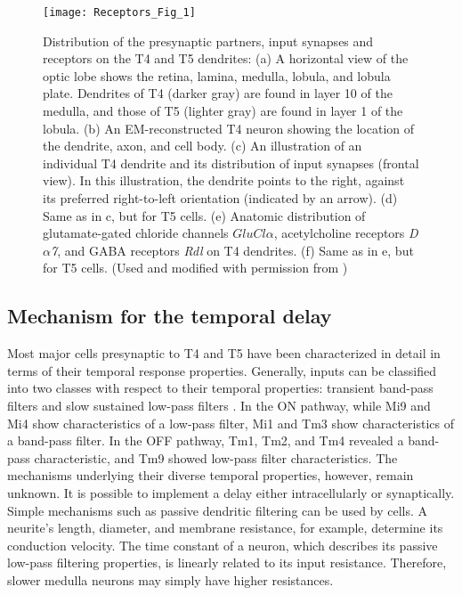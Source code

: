\begin{figure}
\centering
\hspace*{-1cm} 
\texttt{[image: Receptors\_Fig\_1]}
\caption[Distribution of the presynaptic partners, input synapses and receptors on the T4 and T5 dendrites] {Distribution of the presynaptic partners, input synapses and receptors on the T4 and T5 dendrites: (a) A horizontal view of the optic lobe shows the retina, lamina, medulla, lobula, and lobula plate. Dendrites of T4 (darker gray) are found in layer 10 of the medulla, and those of T5 (lighter gray) are found in layer 1 of the lobula. (b) An EM-reconstructed T4 neuron showing the location of the dendrite, axon, and cell body. (c) An illustration of an individual T4 dendrite and its distribution of input synapses (frontal view). In this illustration, the dendrite points to the right, against its preferred right-to-left orientation (indicated by an arrow). (d) Same as in c, but for T5 cells. (e) Anatomic distribution of glutamate-gated chloride channels \textit{$GluCl\alpha$}, acetylcholine receptors \textit{D$\alpha$7}, and GABA receptors \textit{Rdl} on T4 dendrites. (f) Same as in e, but for T5 cells. (Used and modified with permission from \parencite{Fendl2020})} 
\label{fig:receptors}
\end{figure}

\subsection{Mechanism for the temporal delay}
Most major cells presynaptic to T4 and T5 have been characterized in detail in terms of their temporal response properties. Generally, inputs can be classified into two classes with respect to their temporal properties: transient band-pass filters and slow sustained low-pass filters \parencite{Arenz2017, Serbe2016, Behnia2014}. In the ON pathway, while Mi9 and Mi4 show characteristics of a low-pass filter, Mi1 and Tm3 show characteristics of a band-pass filter. In the OFF pathway, Tm1, Tm2, and Tm4 revealed a band-pass characteristic, and Tm9 showed low-pass filter characteristics. The mechanisms underlying their diverse temporal properties, however, remain unknown. It is possible to implement a delay either intracellularly or synaptically. Simple mechanisms such as passive dendritic filtering can be used by cells. A neurite's length, diameter, and membrane resistance, for example, determine its conduction velocity. The time constant of a neuron, which describes its passive low-pass filtering properties, is linearly related to its input resistance. Therefore, slower medulla neurons may simply have higher resistances.

